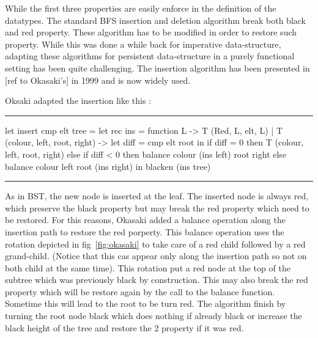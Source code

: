 \documentclass[10pt,a4paper]{article}
\newenvironment{codeblock}%
{\center \minipage{\textwidth} \vspace{6pt} \hrule \vspace{6pt} \minted{ocaml}}%
{\endminted \hrule \vspace{6pt} \endminipage \endcenter}
\begin{document}
While the first three properties are easily enforce in the definition of the datatypes. The standard BFS insertion and deletion algorithm break both black and red property. These algorithm has to be modified in order to restore such property. While this was done a while back for imperative data-structure, adapting these algorithms for persistent data-structure in a purely functional setting has been quite challenging. The insertion algorithm has been presented in [ref to Okasaki's] in 1999 and is now widely used.


Oksaki adapted the insertion like this :
\begin{codeblock}
let insert cmp elt tree =
    let rec ins = function
        L -> T (Red, L, elt, L)
      | T (colour, left, root, right) ->
         let diff = cmp elt root in
         if diff = 0 then T (colour, left, root, right)
         else if diff < 0 then
            balance colour (ins left) root right
         else
            balance colour left root (ins right)
    in blacken (ins tree)
\end{codeblock}

As in BST, the new node is inserted at the leaf. The inserted node is always red, which preserve the black property but may break the red property which need to be restored. For this reasons, Okasaki added a balance operation along the insertion path to restore the red porperty. This balance operation uses the rotation depicted in fig~\ref{fig:okasaki} to take care of a red child followed by a red grand-child. (Notice that this cas appear only along the insertion path so not on both child at the same time). This rotation put a red node at the top of the subtree which was previously black by construction. This may also break the red property which will be restore again by the call to the balance function. Sometime this will lead to the root to be turn red. The algorithm finish by turning the root node black which does nothing if already black or increase the black height of the tree and restore the 2 property if it was red.
\end{document}

